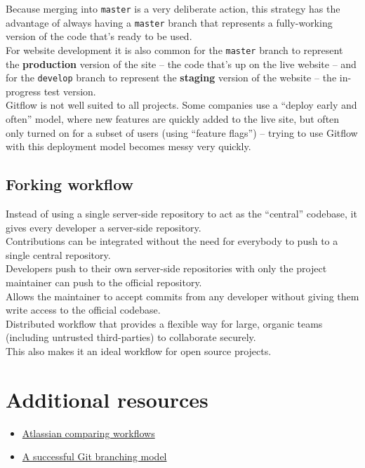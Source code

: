 
Because merging into \texttt{master} is a very deliberate action, this strategy has the advantage of always having a \texttt{master} branch that represents a fully-working version of the code that's ready to be used.
\\

For website development it is also common for the \texttt{master} branch to represent the \textbf{production} version of the site – the code that's up on the live website – and for the \texttt{develop} branch to represent the \textbf{staging} version of the website – the in-progress test version.
\\

Gitflow is not well suited to all projects. Some companies use a ``deploy early and often'' model, where new features are quickly added to the live site, but often only turned on for a subset of users (using ``feature flags'') – trying to use Gitflow with this deployment model becomes messy very quickly.





\subsection{Forking workflow}

Instead of using a single server-side repository to act as the “central” codebase, it gives every developer a server-side repository.
\\

Contributions can be integrated without the need for everybody to push to a single central repository.
\\

Developers push to their own server-side repositories with only the project maintainer can push to the official repository.
\\

Allows the maintainer to accept commits from any developer without giving them write access to the official codebase.
\\

Distributed workflow that provides a flexible way for large, organic teams (including untrusted third-parties) to collaborate securely.
\\

This also makes it an ideal workflow for open source projects.



\section{Additional resources}

\begin{itemize}[leftmargin=*]
    \item \href{https://www.atlassian.com/git/tutorials/comparing-workflows}{Atlassian comparing workflows}
	\item \href{https://nvie.com/posts/a-successful-git-branching-model/}{A successful Git branching model}
\end{itemize}

